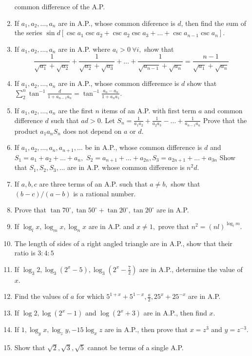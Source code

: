 \begin{enumerate}
  common difference of the A.P.
\item If $a_1, a_2, \ldots, a_n$ are in A.P., whose common diference is $d$, then find the sum of the series $\sin
  d[\csc a_1\csc a_2 + \csc a_2\csc a_3 + \ldots + \csc a_{n - 1}\csc a_n]$.
\item If $a_1, a_2, \ldots, a_n$ are in A.P. where $a_i > 0~\forall i,$ show that $$\frac{1}{\sqrt{a_1} + \sqrt{a_2}} +
  \frac{1}{\sqrt{a_2} + \sqrt{a_3}} + \ldots + \frac{1}{\sqrt{a_{n - 1}} + \sqrt{a_n}} = \frac{n - 1}{\sqrt{a_1} + \sqrt{a_n}}$$
\item If $a_1, a_2, \ldots, a_n$ are in A.P., whose common differemce is $d$ show that $\sum_{2}^n\tan^{-1}\frac{d}{1 +
  a_{n - 1}a_n} = \tan^{-1}\frac{a_n - a_n}{1 + a_na_1}$.
\item If $a_1, a_2, \ldots, a_n$ are the first $n$ items of an A.P. with first term $a$ and common difference $d$ such
  that $ad > 0.$ Let $S_n = \frac{1}{a_1a_2} + \frac{1}{a_2a_3} - \ldots + \frac{1}{a_{n - 1}a_n}$ Prove that the product
  $a_1a_nS_n$ does not depend on $a$ or $d$.
\item If $a_1, a_2, \ldots, a_n, a_{n + 1}, \ldots$ be in A.P., whose common difference is $d$ and $S_1 = a_1 + a_2 +
  \ldots + a_n,$ $S_2 = a_{n + 1} + \ldots + a_{2n}, S_3 = a_{2n + 1} + \ldots + a_{3n}$ Show that $S_1, S_2, S_3, \ldots$ are in
  A.P. whose common difference is $n^2d$.
\item If $a, b, c$ are three terms of an A.P. such that $a\neq b,$ show that $(b - c)/(a - b)$ is a rational number.
\item Prove that $\tan 70^\circ, \tan 50^\circ + \tan 20^\circ, \tan 20^\circ$ are in A.P.
\item If $\log_l x, \log_m x, \log_n x$ are in A.P. and $x \neq 1,$ prove that $n^2 = (nl)^{\log_l m}$.
\item The length of sides of a right angled triangle are in A.P., show that their ratio is $3:4:5$
\item If $\log_3 2, \log_3(2^x - 5), \log_3\left(2^x - \frac{7}{2}\right)$ are in A.P., determine the value of $x$.
\item Find the values of $a$ for which $5^{1 + x} + 5^{1 - x}, \frac{a}{2}, 25^x + 25^{-x}$ are in A.P.
\item If $\log 2, \log(2^x - 1)$ and $\log(2^x + 3)$ are in A.P., then find $x$.
\item If $1, \log_y x, \log_zy, -15\log_xz$ are in A.P., then prove that $x = z^3$ and $y = z^{-3}$.
\item Show that $\sqrt{2}, \sqrt{3}, \sqrt{5}$ cannot be terms of a single A.P.

\end{enumerate}
